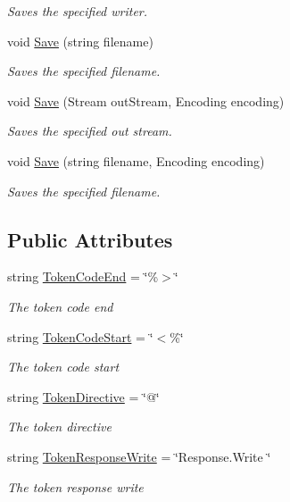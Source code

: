 \begin{DoxyCompactItemize}
\begin{DoxyCompactList}\small\item\em Saves the specified writer. \end{DoxyCompactList}\item 
void \hyperlink{class_html_agility_pack_1_1_mixed_code_document_a51c5b0dd756d8b08b32333208337643c}{Save} (string filename)
\begin{DoxyCompactList}\small\item\em Saves the specified filename. \end{DoxyCompactList}\item 
void \hyperlink{class_html_agility_pack_1_1_mixed_code_document_a584d7707b9d840117175e9767ef8891b}{Save} (Stream out\+Stream, Encoding encoding)
\begin{DoxyCompactList}\small\item\em Saves the specified out stream. \end{DoxyCompactList}\item 
void \hyperlink{class_html_agility_pack_1_1_mixed_code_document_a0d35b5845418e984eafddb23574e3acb}{Save} (string filename, Encoding encoding)
\begin{DoxyCompactList}\small\item\em Saves the specified filename. \end{DoxyCompactList}\end{DoxyCompactItemize}
\subsection*{Public Attributes}
\begin{DoxyCompactItemize}
\item 
string \hyperlink{class_html_agility_pack_1_1_mixed_code_document_a12e7fd0d9cad060a4821fc86c9726172}{Token\+Code\+End} = \char`\"{}\%$>$\char`\"{}
\begin{DoxyCompactList}\small\item\em The token code end \end{DoxyCompactList}\item 
string \hyperlink{class_html_agility_pack_1_1_mixed_code_document_ae5b9c2ab3f2e3ad41401da1140f91b9d}{Token\+Code\+Start} = \char`\"{}$<$\%\char`\"{}
\begin{DoxyCompactList}\small\item\em The token code start \end{DoxyCompactList}\item 
string \hyperlink{class_html_agility_pack_1_1_mixed_code_document_adc7ad085b1bd40e1ac6ba2054b65c96b}{Token\+Directive} = \char`\"{}@\char`\"{}
\begin{DoxyCompactList}\small\item\em The token directive \end{DoxyCompactList}\item 
string \hyperlink{class_html_agility_pack_1_1_mixed_code_document_a14572ede1420a32d4d72083d20764186}{Token\+Response\+Write} = \char`\"{}Response.\+Write \char`\"{}
\begin{DoxyCompactList}\small\item\em The token response write \end{DoxyCompactList}\end{DoxyCompactItemize}
